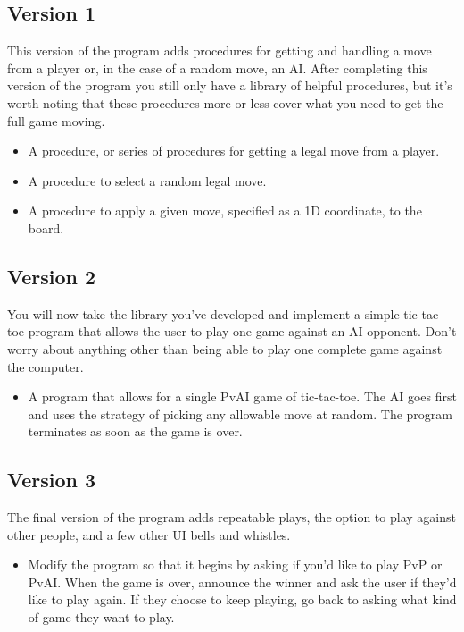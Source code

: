 \documentclass[]{tufte-handout}
\begin{document}
\subsection{Version 1}

This version of the program adds procedures for getting and handling a move from
a player or, in the case of a random move, an AI.  After completing this version
of the program you still only have a library of helpful procedures, but it's
worth noting that these procedures more or less cover what you need to get the
full game moving.

\begin{itemize}
  \item A procedure, or series of procedures for getting a legal move from a
  player.
  \item A procedure to select a random legal move.
  \item A procedure to apply a given move, specified as a 1D coordinate, to
  the board.
\end{itemize}



\subsection{Version 2}

You will now take the library you've developed and implement a simple tic-tac-toe
program that allows the user to play one game against an AI opponent. Don't worry
about anything other than being able to play one complete game against the
computer.

\begin{itemize}
  \item A program that allows for a single PvAI game of tic-tac-toe. The AI goes
  first and uses the strategy of picking any allowable move at random. The program
  terminates as soon as the game is over.
\end{itemize}

\subsection{Version 3}

The final version of the program adds repeatable plays, the option to play against
other people, and a few other UI bells and whistles.

\begin{itemize}
  \item Modify the program so that it begins by asking if you'd like to play PvP
  or PvAI. When the game is over, announce the winner and ask the user if they'd
  like to play again. If they choose to keep playing, go back to asking what kind
  of game they want to play.
\end{itemize}
\end{document}
